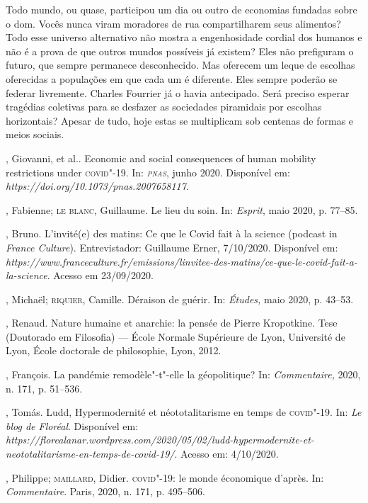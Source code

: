 Todo mundo, ou quase, participou um dia ou outro de economias fundadas
sobre o dom. Vocês nunca viram moradores de rua compartilharem seus
alimentos? Todo esse universo alternativo não mostra a engenhosidade
cordial dos humanos e não é a prova de que outros mundos possíveis já
existem? Eles não prefiguram o futuro, que sempre permanece
desconhecido. Mas oferecem um leque de escolhas oferecidas a populações
em que cada um é diferente. Eles sempre poderão se federar livremente.
Charles Fourrier já o havia antecipado. Será preciso esperar tragédias
coletivas para se desfazer as sociedades piramidais por escolhas
horizontais? Apesar de tudo, hoje estas se multiplicam sob centenas de
formas e meios sociais.


\begin{bibliohedra}
, Giovanni, et al.. Economic and social consequences of human
mobility restrictions under \textsc{covid}"-19. In: \emph{\textsc{pnas}}, junho 2020.
Disponível em: \emph{https://doi.org/10.1073/pnas.2007658117}.

, Fabienne; \textsc{le blanc}, Guillaume. Le lieu du soin. In:
\emph{Esprit}, maio 2020, p. 77--85.

, Bruno. L'invité(e) des matins: Ce que le Covid fait à la science
(podcast in \emph{France Culture}). Entrevistador: Guillaume Erner,
7/10/2020. Disponível em:
\emph{https://www.franceculture.fr/emissions/linvitee-des-matins/ce-que-le-covid-fait-a-la-science}.
Acesso em 23/09/2020.

, Michaël; \textsc{riquier}, Camille. Déraison de guérir. In:
\emph{Études,} maio 2020, p. 43--53.

, Renaud. Nature humaine et anarchie: la pensée de Pierre
Kropotkine. Tese (Doutorado em Filosofia) --- École Normale Supérieure
de Lyon, Université de Lyon, École doctorale de philosophie, Lyon, 2012.

, François. La pandémie remodèle"-t"-elle la géopolitique? In:
\emph{Commentaire,} 2020, n. 171, p. 51--536.

, Tomás. Ludd, Hypermodernité et néototalitarisme en temps de
\textsc{covid}"-19. In: \emph{Le blog de Floréal}. Disponível em:
\emph{https://florealanar.wordpress.com/2020/05/02/ludd-hypermodernite-et-neototalitarisme-en-temps-de-covid-19/}.
Acesso em: 4/10/2020.

, Philippe; \textsc{maillard}, Didier. \textsc{covid}"-19: le monde économique
d'après. In: \emph{Commentaire}. Paris, 2020, n. 171, p. 495--506.


\end{bibliohedra}
